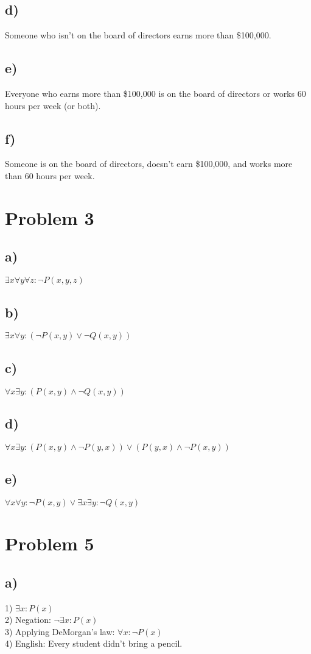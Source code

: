 \documentclass{article}
\begin{document}
\subsection*{d)}
Someone who isn't on the board of directors earns more than \$100,000.
\subsection*{e)}
Everyone who earns more than \$100,000 is on the board of directors or works 60 hours per week (or both).
\subsection*{f)}
Someone is on the board of directors, doesn't earn \$100,000, and works more than 60 hours per week.
\clearpage
\section*{Problem 3}
\subsection*{a)}
$\exists x\forall y\forall z: \neg P(x,y,z)$
\subsection*{b)}
$\exists x \forall y :(\neg P(x,y) \lor \neg Q(x,y))$
\subsection*{c)}
$\forall x\exists y:(P(x,y)\land \neg Q(x,y))$
\subsection*{d)}
$\forall x\exists y:(P(x,y)\land \neg P(y,x))\lor(P(y,x)\land \neg P(x,y))$
\subsection*{e)}
$\forall x\forall y:\neg P(x,y)\lor\exists x\exists y:\neg Q(x,y)$

\section*{Problem 5}
\subsection*{a)}
1) $\exists x: P(x)$\\
2) Negation: $\neg \exists x: P(x)$\\
3) Applying DeMorgan's law: $\forall x: \neg P(x)$\\
4) English: Every student didn't bring a pencil.
\end{document}
